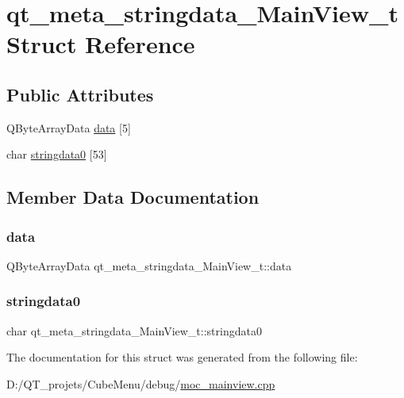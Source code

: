 \hypertarget{structqt__meta__stringdata___main_view__t}{}\section{qt\+\_\+meta\+\_\+stringdata\+\_\+\+Main\+View\+\_\+t Struct Reference}
\label{structqt__meta__stringdata___main_view__t}
\subsection*{Public Attributes}
\begin{DoxyCompactItemize}
\item 
Q\+Byte\+Array\+Data \hyperlink{structqt__meta__stringdata___main_view__t_a3eef91355782fab250988585fdf2e5ad}{data} \mbox{[}5\mbox{]}
\item 
char \hyperlink{structqt__meta__stringdata___main_view__t_abc5243f08f83cd082d01bf06a4c01e34}{stringdata0} \mbox{[}53\mbox{]}
\end{DoxyCompactItemize}


\subsection{Member Data Documentation}
\hypertarget{structqt__meta__stringdata___main_view__t_a3eef91355782fab250988585fdf2e5ad}{}\label{structqt__meta__stringdata___main_view__t_a3eef91355782fab250988585fdf2e5ad} 
\subsubsection{\texorpdfstring{data}{data}}
{\footnotesize\ttfamily Q\+Byte\+Array\+Data qt\+\_\+meta\+\_\+stringdata\+\_\+\+Main\+View\+\_\+t\+::data}

\hypertarget{structqt__meta__stringdata___main_view__t_abc5243f08f83cd082d01bf06a4c01e34}{}\label{structqt__meta__stringdata___main_view__t_abc5243f08f83cd082d01bf06a4c01e34} 
\subsubsection{\texorpdfstring{stringdata0}{stringdata0}}
{\footnotesize\ttfamily char qt\+\_\+meta\+\_\+stringdata\+\_\+\+Main\+View\+\_\+t\+::stringdata0}



The documentation for this struct was generated from the following file\+:\begin{DoxyCompactItemize}
\item 
D\+:/\+Q\+T\+\_\+projets/\+Cube\+Menu/debug/\hyperlink{debug_2moc__mainview_8cpp}{moc\+\_\+mainview.\+cpp}\end{DoxyCompactItemize}
